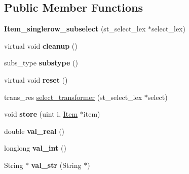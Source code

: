 \subsection*{Public Member Functions}
\begin{DoxyCompactItemize}
\item 
\mbox{\label{classItem__singlerow__subselect_a08d574cb743ce537bf0515e198f929e4}} 
{\bfseries Item\+\_\+singlerow\+\_\+subselect} (st\+\_\+select\+\_\+lex $\ast$select\+\_\+lex)
\item 
\mbox{\label{classItem__singlerow__subselect_a7fabceecb270460cfd4aacd1c0c621dc}} 
virtual void {\bfseries cleanup} ()
\item 
\mbox{\label{classItem__singlerow__subselect_a608cd37a36ce26694c1bc1c9e05f5e50}} 
subs\+\_\+type {\bfseries substype} ()
\item 
\mbox{\label{classItem__singlerow__subselect_af46bdf5d8836e907a3380acbb2118abe}} 
virtual void {\bfseries reset} ()
\item 
trans\+\_\+res \mbox{\hyperlink{classItem__singlerow__subselect_ad94e0b9d5a9d2d386405ef76c2bd0c69}{select\+\_\+transformer}} (st\+\_\+select\+\_\+lex $\ast$select)
\item 
\mbox{\label{classItem__singlerow__subselect_a0ccab45c9019b886e9e41fdd075706a1}} 
void {\bfseries store} (uint i, \mbox{\hyperlink{classItem}{Item}} $\ast$item)
\item 
\mbox{\label{classItem__singlerow__subselect_a0f2eb1142b4776588a83a7472371b503}} 
double {\bfseries val\+\_\+real} ()
\item 
\mbox{\label{classItem__singlerow__subselect_a4b4ea17eaa4cea5704fdf37dd2469f83}} 
longlong {\bfseries val\+\_\+int} ()
\item 
\mbox{\label{classItem__singlerow__subselect_a615f3fe29ffb8cfccf2e55a52102a581}} 
String $\ast$ {\bfseries val\+\_\+str} (String $\ast$)
\item 
\mbox{\label{classItem__singlerow__subselect_ae4aaee8810d93b659cca2df1a67649e0}} 

\end{DoxyCompactItemize}
